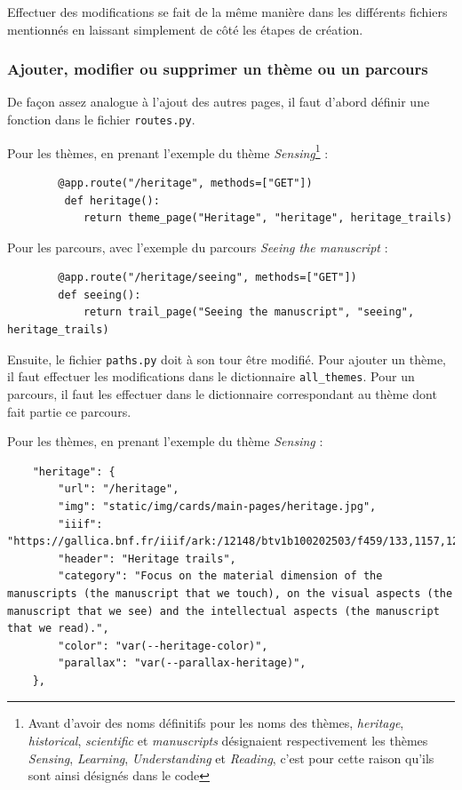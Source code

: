     Effectuer des modifications se fait de la même manière dans les différents fichiers mentionnés en laissant simplement de côté les étapes de création. 

    \subsubsection{Ajouter, modifier ou supprimer un thème ou un parcours}
    De façon assez analogue à l'ajout des autres pages, il faut d'abord définir une fonction dans le fichier \texttt{routes.py}. 
    
    Pour les thèmes, en prenant l'exemple du thème \textit{Sensing}\footnote{Avant d'avoir des noms définitifs pour les noms des thèmes, \textit{heritage}, \textit{historical}, \textit{scientific} et \textit{manuscripts} désignaient respectivement les thèmes \textit{Sensing}, \textit{Learning}, \textit{Understanding} et \textit{Reading}, c'est pour cette raison qu'ils sont ainsi désignés dans le code } : 
    \begin{verbatim}
        @app.route("/heritage", methods=["GET"])
         def heritage():
            return theme_page("Heritage", "heritage", heritage_trails)
    \end{verbatim}
    
    Pour les parcours, avec l'exemple du parcours \textit{Seeing the manuscript} : 
    \begin{verbatim}
        @app.route("/heritage/seeing", methods=["GET"])
        def seeing():
            return trail_page("Seeing the manuscript", "seeing", heritage_trails)
    \end{verbatim}
    
    Ensuite, le fichier \texttt{paths.py} doit à son tour être modifié. Pour ajouter un thème, il faut effectuer les modifications dans le dictionnaire \texttt{all\_themes}. Pour un parcours, il faut les effectuer dans le dictionnaire correspondant au thème dont fait partie ce parcours. 
    
    Pour les thèmes, en prenant l'exemple du thème \textit{Sensing} :
    \begin{verbatim}
    "heritage": {
        "url": "/heritage",
        "img": "static/img/cards/main-pages/heritage.jpg",
        "iiif": "https://gallica.bnf.fr/iiif/ark:/12148/btv1b100202503/f459/133,1157,1262,490/full/0/native.jpg",
        "header": "Heritage trails",
        "category": "Focus on the material dimension of the manuscripts (the manuscript that we touch), on the visual aspects (the manuscript that we see) and the intellectual aspects (the manuscript that we read).",
        "color": "var(--heritage-color)",
        "parallax": "var(--parallax-heritage)",
    },
    \end{verbatim}
    
